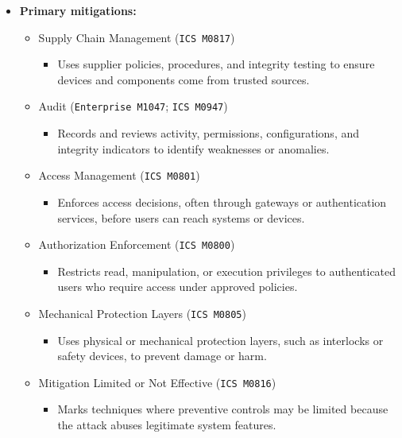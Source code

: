 \documentclass[10pt,a4paper,oneside]{report}
\begin{document}
\begin{itemize}
\item \textbf{Primary mitigations:}
\begin{itemize}
\item Supply Chain Management (\texttt{ICS M0817})
\begin{itemize}
\item Uses supplier policies, procedures, and integrity testing to ensure devices and components come from trusted sources.
\end{itemize}
\item Audit (\texttt{Enterprise M1047}; \texttt{ICS M0947})
\begin{itemize}
\item Records and reviews activity, permissions, configurations, and integrity indicators to identify weaknesses or anomalies.
\end{itemize}
\item Access Management (\texttt{ICS M0801})
\begin{itemize}
\item Enforces access decisions, often through gateways or authentication services, before users can reach systems or devices.
\end{itemize}
\item Authorization Enforcement (\texttt{ICS M0800})
\begin{itemize}
\item Restricts read, manipulation, or execution privileges to authenticated users who require access under approved policies.
\end{itemize}
\item Mechanical Protection Layers (\texttt{ICS M0805})
\begin{itemize}
\item Uses physical or mechanical protection layers, such as interlocks or safety devices, to prevent damage or harm.
\end{itemize}
\item Mitigation Limited or Not Effective (\texttt{ICS M0816})
\begin{itemize}
\item Marks techniques where preventive controls may be limited because the attack abuses legitimate system features.
\end{itemize}
\end{itemize}
\end{itemize}
\end{document}
